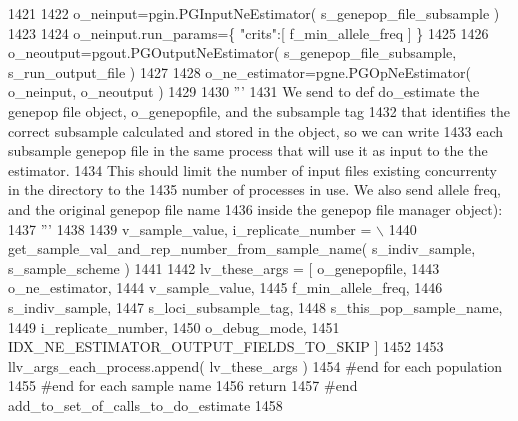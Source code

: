 \begin{DoxyCode}
1421 
1422             o\_neinput=pgin.PGInputNeEstimator( s\_genepop\_file\_subsample )
1423 
1424             o\_neinput.run\_params=\{ \textcolor{stringliteral}{"crits"}:[ f\_min\_allele\_freq ]  \}
1425 
1426             o\_neoutput=pgout.PGOutputNeEstimator( s\_genepop\_file\_subsample, s\_run\_output\_file ) 
1427 
1428             o\_ne\_estimator=pgne.PGOpNeEstimator( o\_neinput, o\_neoutput ) 
1429             
1430             \textcolor{stringliteral}{'''}
1431 \textcolor{stringliteral}{            We send to def do\_estimate the genepop file object, o\_genepopfile, and the subsample tag}
1432 \textcolor{stringliteral}{            that identifies the correct subsample calculated and stored in the object, so we can write}
1433 \textcolor{stringliteral}{            each subsample genepop file in the same process that will use it as input to the the estimator.}
1434 \textcolor{stringliteral}{            This should limit the number of input files existing concurrenty in the directory to the }
1435 \textcolor{stringliteral}{            number of processes in use.  We also send allele freq, and the original genepop file name }
1436 \textcolor{stringliteral}{            inside the genepop file manager object):}
1437 \textcolor{stringliteral}{            '''}
1438 
1439             v\_sample\_value, i\_replicate\_number = \(\backslash\)
1440                     get\_sample\_val\_and\_rep\_number\_from\_sample\_name( s\_indiv\_sample, s\_sample\_scheme )
1441 
1442             lv\_these\_args = [ o\_genepopfile,  
1443                                 o\_ne\_estimator, 
1444                                 v\_sample\_value, 
1445                                 f\_min\_allele\_freq, 
1446                                 s\_indiv\_sample, 
1447                                 s\_loci\_subsample\_tag,
1448                                 s\_this\_pop\_sample\_name, 
1449                                 i\_replicate\_number, 
1450                                 o\_debug\_mode,
1451                                 IDX\_NE\_ESTIMATOR\_OUTPUT\_FIELDS\_TO\_SKIP ]
1452 
1453             llv\_args\_each\_process.append( lv\_these\_args )
1454         \textcolor{comment}{#end for each population}
1455     \textcolor{comment}{#end for each sample name}
1456     \textcolor{keywordflow}{return}
1457 \textcolor{comment}{#end add\_to\_set\_of\_calls\_to\_do\_estimate}
1458 
\end{DoxyCode}
